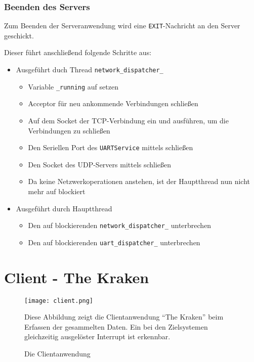\subsubsection*{Beenden des Servers}
Zum Beenden der Serveranwendung wird eine \texttt{EXIT}-Nachricht an den Server
geschickt.
\begin{minipage}[c]{\textwidth}
Dieser führt anschließend folgende Schritte aus:
\begin{itemize}
  \item Ausgeführt duch Thread \texttt{network\_dispatcher\_}
  \begin{itemize}
  \item Variable \texttt{\_running} auf  setzen
  \item Acceptor für neu ankommende Verbindungen schließen
  \item Auf dem Socket der TCP-Verbindung ein 
  und  ausführen, um die Verbindungen zu schließen
  \item Den Seriellen Port des \texttt{UARTService} mittels
   schließen
  \item Den Socket des UDP-Servers mittels 
  schließen
  \item Da keine Netzwerkoperationen anstehen, ist der Hauptthread nun nicht
  mehr auf   blockiert
  \end{itemize}
  \item Ausgeführt durch Hauptthread
  \begin{itemize}
    \item Den auf  blockierenden
    \texttt{network\_dispatcher\_} unterbrechen
    \item Den auf  blockierenden
    \texttt{uart\_dispatcher\_} unterbrechen
  \end{itemize}
\end{itemize}
\end{minipage}
\section{Client - The Kraken}
\begin{figure}[!ht]
\centering
\texttt{[image: client.png]}
\caption{Die Clientanwendung}{Diese Abbildung zeigt die Clientanwendung
"`The Kraken"' beim Erfassen der gesammelten Daten. Ein bei den
Zielsystemen gleichzeitig ausgelöster Interrupt ist erkennbar.}
\label{fig:client}
\end{figure}
